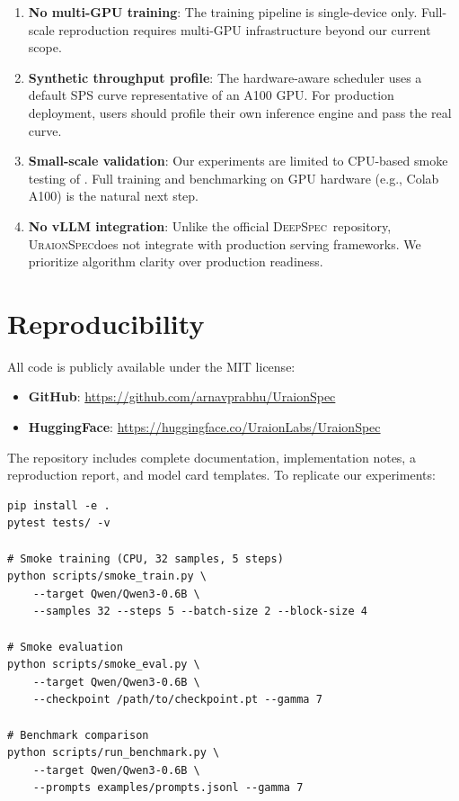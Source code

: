 \documentclass[11pt,a4paper]{article}
\newcommand{\UraionSpec}{\textsc{UraionSpec}}
\newcommand{\DeepSpec}{\textsc{DeepSpec}}
\begin{document}
\begin{enumerate}
  \item \textbf{No multi-GPU training}: The training pipeline is
    single-device only. Full-scale reproduction requires multi-GPU
    infrastructure beyond our current scope.
  \item \textbf{Synthetic throughput profile}: The hardware-aware scheduler
    uses a default SPS curve representative of an A100 GPU. For
    production deployment, users should profile their own inference engine
    and pass the real curve.
  \item \textbf{Small-scale validation}: Our experiments are limited to
    CPU-based smoke testing of . Full training and
    benchmarking on GPU hardware (e.g., Colab A100) is the natural next
    step.
  \item \textbf{No vLLM integration}: Unlike the official \DeepSpec\
    repository, \UraionSpec does not integrate with production serving
    frameworks. We prioritize algorithm clarity over production readiness.
\end{enumerate}

\section{Reproducibility}
\label{sec:reproducibility}

All code is publicly available under the MIT license:

\begin{itemize}[leftmargin=*,itemsep=2pt]
  \item \textbf{GitHub}: \url{https://github.com/arnavprabhu/UraionSpec}
  \item \textbf{HuggingFace}: \url{https://huggingface.co/UraionLabs/UraionSpec}
\end{itemize}

The repository includes complete documentation, implementation notes, a
reproduction report, and model card templates. To replicate our experiments:
\begin{verbatim}
pip install -e .
pytest tests/ -v

# Smoke training (CPU, 32 samples, 5 steps)
python scripts/smoke_train.py \
    --target Qwen/Qwen3-0.6B \
    --samples 32 --steps 5 --batch-size 2 --block-size 4

# Smoke evaluation
python scripts/smoke_eval.py \
    --target Qwen/Qwen3-0.6B \
    --checkpoint /path/to/checkpoint.pt --gamma 7

# Benchmark comparison
python scripts/run_benchmark.py \
    --target Qwen/Qwen3-0.6B \
    --prompts examples/prompts.jsonl --gamma 7
\end{verbatim}
\end{document}
